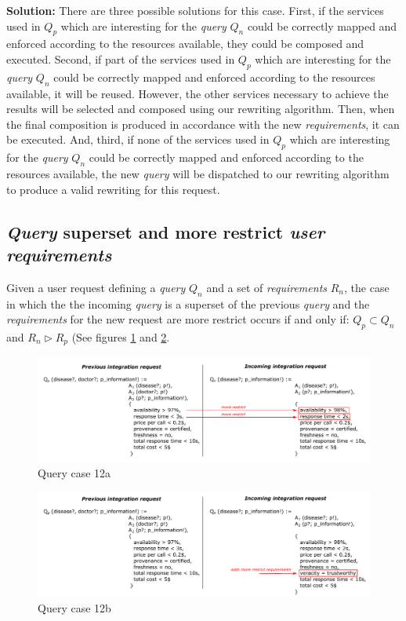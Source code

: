 \bigskip
\noindent \textbf{Solution:} There are three possible solutions for this case. First, if the services used in $Q_{p}$ which are interesting for the \textsl{query} $Q_{n}$ could be correctly mapped and enforced according to the resources available, they could be composed and executed. Second, if part of the services  used in $Q_{p}$ which are interesting for the \textsl{query} $Q_{n}$ could be correctly mapped and enforced according to the resources available, it will be reused. However, the other services necessary to achieve the results will be selected and composed using our rewriting algorithm. Then, when the final composition is produced in accordance with the new \textsl{requirements}, it can be executed. And, third, if none of the services used in $Q_{p}$ which are interesting for the \textsl{query} $Q_{n}$ could be correctly mapped and enforced according to the resources available, the new \textsl{query} will be dispatched to our rewriting algorithm to produce a valid rewriting for this request.

\subsection{\textsl{Query} superset and more restrict \textsl{user requirements}}
Given a user request defining a \textsl{query} $Q_{n}$ and a set of \textsl{requirements} $R_{n}$, the case in which the the incoming \textsl{query} is a superset of the previous \textsl{query} and the \textsl{requirements} for the new request are more restrict occurs if and only if: $Q_{p} \subset Q_{n}$ and $R_{n} \triangleright R_{p}$ (See figures \ref{fig:case12a} and \ref{fig:case12b}.

\begin{figure}[h!]
\center
\includegraphics[scale=0.85]{figures/query-case-12a.pdf}\caption{Query case 12a} \label{fig:case12a}
\end{figure}

\begin{figure}[h!]
\center
\includegraphics[scale=0.85]{figures/query-case-12b.pdf}\caption{Query case 12b} \label{fig:case12b}
\end{figure}

